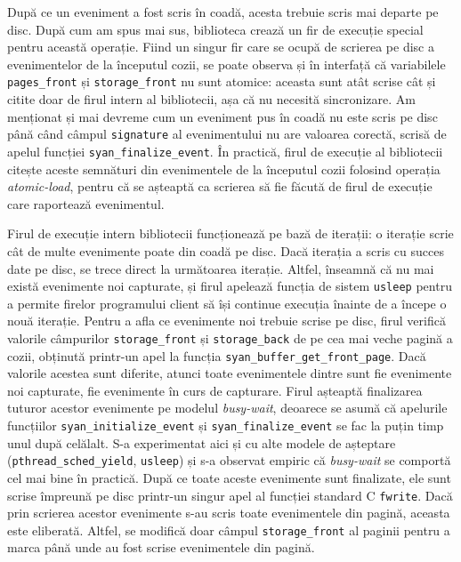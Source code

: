 După ce un eveniment a fost scris în coadă, acesta trebuie scris mai
departe pe disc. După cum am spus mai sus, biblioteca crează un fir de
execuție special pentru această operație. Fiind un singur fir care se
ocupă de scrierea pe disc a evenimentelor de la începutul cozii, se
poate observa și în interfață că variabilele \lstinline{pages_front} și
\lstinline{storage_front} nu sunt atomice: aceasta sunt atât scrise cât
și citite doar de firul intern al bibliotecii, așa că nu necesită
sincronizare. Am menționat și mai devreme cum un eveniment pus în coadă
nu este scris pe disc până când câmpul \lstinline{signature} al
evenimentului nu are valoarea corectă, scrisă de apelul funcției
\lstinline{syan_finalize_event}. În practică, firul de execuție al
bibliotecii citește aceste semnături din evenimentele de la începutul
cozii folosind operația \textit{atomic-load}, pentru că se așteaptă ca
scrierea să fie făcută de firul de execuție care raportează evenimentul.

Firul de execuție intern bibliotecii funcționează pe bază de iterații:
o iterație scrie cât de multe evenimente poate din coadă pe disc. Dacă
iterația a scris cu succes date pe disc, se trece direct la următoarea
iterație. Altfel, înseamnă că nu mai există evenimente noi capturate, și
firul apelează funcția de sistem \lstinline{usleep} pentru a permite
firelor programului client să își continue execuția înainte de a începe
o nouă iterație. Pentru a afla ce evenimente noi trebuie scrise pe disc,
firul verifică valorile câmpurilor \lstinline{storage_front} și
\lstinline{storage_back} de pe cea mai veche pagină a cozii, obținută
printr-un apel la funcția \lstinline{syan_buffer_get_front_page}. Dacă
valorile acestea sunt diferite, atunci toate evenimentele dintre sunt
fie evenimente noi capturate, fie evenimente în curs de capturare. Firul
așteaptă finalizarea tuturor acestor evenimente pe modelul
\textit{busy-wait}, deoarece se asumă că apelurile funcțiilor
\lstinline{syan_initialize_event} și \lstinline{syan_finalize_event}
se fac la puțin timp unul după celălalt. S-a experimentat aici și cu
alte modele de așteptare (\lstinline{pthread_sched_yield},
\lstinline{usleep}) și s-a observat empiric că \textit{busy-wait} se
comportă cel mai bine în practică. După ce toate aceste evenimente sunt
finalizate, ele sunt scrise împreună pe disc printr-un singur apel al
funcției standard C \lstinline{fwrite}. Dacă prin scrierea acestor
evenimente s-au scris toate evenimentele din pagină, aceasta este
eliberată. Altfel, se modifică doar câmpul \lstinline{storage_front} al
paginii pentru a marca până unde au fost scrise evenimentele din pagină.


